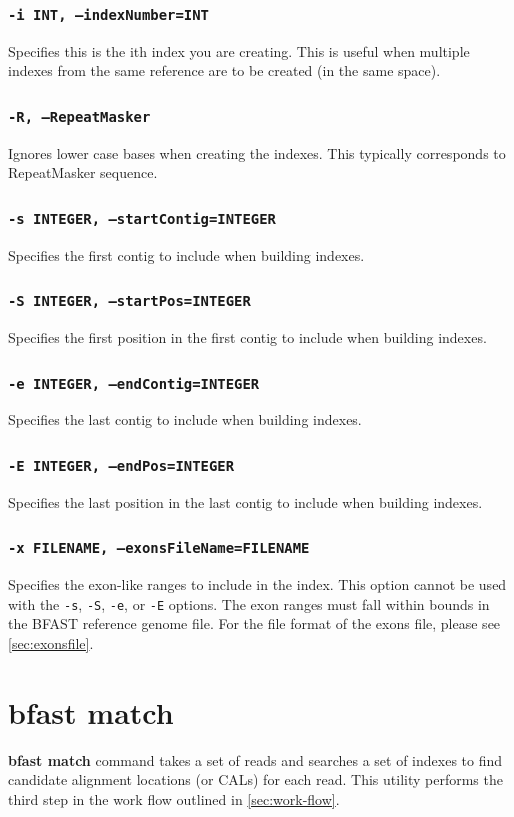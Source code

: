 \documentclass[a4paper,12pt]{book}
\newcommand{\TT}[1]{{\tt #1}} %
\newcommand{\BF}[1]{{\bf #1}} %
\newcommand{\BRGF}{BFAST reference genome file} %
\begin{document}
\subsubsection{\TT{-i INT, --indexNumber=INT}}
Specifies this is the ith index you are creating.
This is useful when multiple indexes from the same reference are to be created (in the same space).

\subsubsection{\TT{-R, --RepeatMasker}}
Ignores lower case bases when creating the indexes.
This typically corresponds to RepeatMasker sequence.

\subsubsection{\TT{-s INTEGER, --startContig=INTEGER}}
Specifies the first contig to include when building indexes.

\subsubsection{\TT{-S INTEGER, --startPos=INTEGER}}
Specifies the first position in the first contig to include when building indexes.

\subsubsection{\TT{-e INTEGER, --endContig=INTEGER}}
Specifies the last contig to include when building indexes.

\subsubsection{\TT{-E INTEGER, --endPos=INTEGER}}
Specifies the last position in the last contig to include when building indexes.

\subsubsection{\TT{-x FILENAME, --exonsFileName=FILENAME}}
Specifies the exon-like ranges to include in the index.
This option cannot be used with the \TT{-s}, \TT{-S}, \TT{-e}, or \TT{-E} options.
The exon ranges must fall within bounds in the \BRGF{}.
For the file format of the exons file, please see \autoref{sec:exonsfile}.

\section{bfast match}
\label{sec:match}
\BF{bfast match} command takes a set of reads and searches a set of indexes to find candidate alignment locations (or CALs) for each read.
This utility performs the third step in the work flow outlined in \autoref{sec:work-flow}.
\end{document}
